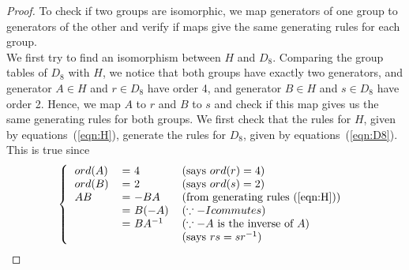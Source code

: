 \documentclass{article}
\begin{document}
\begin{enumerate}
\begin{enumerate}
\begin{proof}
          To check if two groups are isomorphic, we map generators of one
          group to generators of the other and verify if maps give the same
          generating rules for each group. \\

          We first try to find an isomorphism between $H$ and $D_8$.
          Comparing the group tables of $D_8$ with $H$, we notice that both
          groups have exactly two generators, and generator $A\in H$ and
          $r\in D_8$ have order 4, and generator $B\in H$ and $s\in D_8$
          have order 2. Hence, we map $A$ to $r$ and $B$ to $s$ and check
          if this map gives us the same generating rules for both groups.
          We first check that the rules for $H$, given by
          equations~(\ref{eqn:H}), generate the rules for $D_8$, given by
          equations~(\ref{eqn:D8}). This is true since
          \[\left \{
            \begin{tabular}{lll}
              $ord(A)$  & = $4$         & (says $ord(r)=4$) \\
              $ord(B)$  & = $2$         & (says $ord(s)=2$) \\
              $AB$      & = $-BA$       & (from generating
              rules~(\ref{eqn:H})) \\
                        & = $B(-A)$     & ($\because -I commutes$) \\
                        & = $BA^{-1}$   & ($\because -A$ is the inverse of $A$) \\
                        &               & (says $rs=sr^{-1}$) \\
            \end{tabular}
          \right .\ \]


\end{proof}
\end{enumerate}
\end{enumerate}
\end{document}
